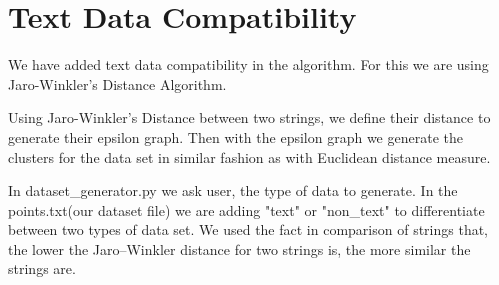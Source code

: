 \documentclass[acmsmall]{acmart}
\begin{document}
\section*{Text Data Compatibility}
We have added text data compatibility in the algorithm. For this we are using Jaro-Winkler's Distance Algorithm.

Using Jaro-Winkler's Distance between two strings, we define their distance to generate their epsilon graph. Then with the epsilon graph we generate the clusters for the data set in similar fashion as with Euclidean distance measure.

In dataset\_generator.py we ask user, the type of data to generate. In the points.txt(our dataset file) we are adding "text" or "non\_text" to differentiate between two types of data set.
We used the fact in comparison of strings that, the lower the Jaro–Winkler distance for two strings is, the more similar the strings are.
\end{document}
